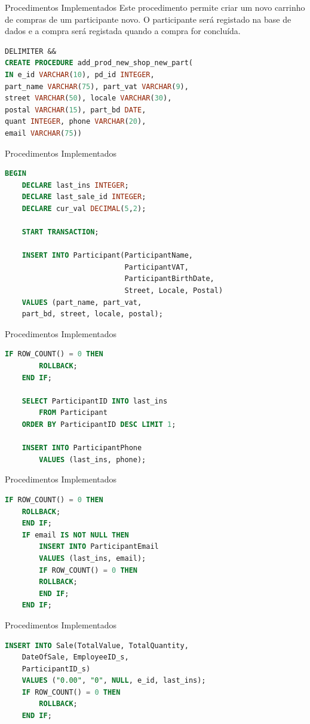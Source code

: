 \documentclass[compress,svgnames,handout,13.7pt]{beamer}
\begin{document}
\begin{frame}[fragile]{Procedimentos Implementados}
Este procedimento permite criar um novo carrinho de compras de um participante novo.
O participante será registado na base de dados e a compra será registada quando
a compra for concluída.
\begin{lstlisting}[language=sql]
DELIMITER &&
CREATE PROCEDURE add_prod_new_shop_new_part(
IN e_id VARCHAR(10), pd_id INTEGER,
part_name VARCHAR(75), part_vat VARCHAR(9),
street VARCHAR(50), locale VARCHAR(30), 
postal VARCHAR(15), part_bd DATE,
quant INTEGER, phone VARCHAR(20), 
email VARCHAR(75))
\end{lstlisting}
\end{frame}
\begin{frame}[fragile]{Procedimentos Implementados}
\begin{lstlisting}[language=sql]
BEGIN
	DECLARE last_ins INTEGER;
    DECLARE last_sale_id INTEGER;
    DECLARE cur_val DECIMAL(5,2);

    START TRANSACTION;

    INSERT INTO Participant(ParticipantName, 
                            ParticipantVAT, 
                            ParticipantBirthDate,
                            Street, Locale, Postal)
    VALUES (part_name, part_vat, 
    part_bd, street, locale, postal);
\end{lstlisting}
\end{frame}
\begin{frame}[fragile]{Procedimentos Implementados}
\begin{lstlisting}[language=sql]
    IF ROW_COUNT() = 0 THEN
		ROLLBACK;
    END IF;

    SELECT ParticipantID INTO last_ins 
        FROM Participant
    ORDER BY ParticipantID DESC LIMIT 1;

    INSERT INTO ParticipantPhone
        VALUES (last_ins, phone);
\end{lstlisting}
\end{frame}
\begin{frame}[fragile]{Procedimentos Implementados}
\begin{lstlisting}[language=sql]
    IF ROW_COUNT() = 0 THEN
	ROLLBACK;
    END IF;
    IF email IS NOT NULL THEN
        INSERT INTO ParticipantEmail
        VALUES (last_ins, email);
        IF ROW_COUNT() = 0 THEN
		ROLLBACK;
        END IF;
    END IF;
\end{lstlisting}
\end{frame}
\begin{frame}[fragile]{Procedimentos Implementados}
\begin{lstlisting}[language=sql]
    INSERT INTO Sale(TotalValue, TotalQuantity, 
    DateOfSale, EmployeeID_s, 
    ParticipantID_s)
    VALUES ("0.00", "0", NULL, e_id, last_ins);
    IF ROW_COUNT() = 0 THEN
		ROLLBACK;
    END IF;
\end{lstlisting}
\end{frame}
\end{document}
